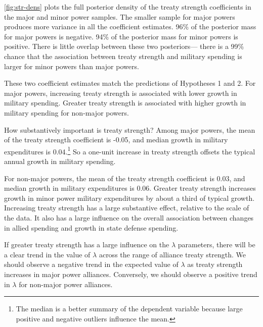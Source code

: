 \documentclass[12pt]{article}
\begin{document}
\autoref{fig:str-dens} plots the full posterior density of the treaty strength coefficients in the major and minor power samples. 
The smaller sample for major powers produces more variance in all the coefficient estimates. 
96\% of the posterior mass for major powers is negative. 
94\% of the posterior mass for minor powers is positive. 
There is little overlap between these two posteriors--- there is a 99\% chance that the association between treaty strength and military spending is larger for minor powers than major powers. 


These two coefficient estimates match the predictions of Hypotheses 1 and 2. 
For major powers, increasing treaty strength is associated with lower growth in military spending. 
Greater treaty strength is associated with higher growth in military spending for non-major powers.


How substantively important is treaty strength? 
Among major powers, the mean of the treaty strength coefficient is -0.05, and median growth in military expenditures is 0.04.\footnote{The median is a better summary of the dependent variable because large positive and negative outliers influence the mean.} 
So a one-unit increase in treaty strength offsets the typical annual growth in military spending. 


For non-major powers, the mean of the treaty strength coefficient is 0.03, and median growth in military expenditures is 0.06. 
Greater treaty strength increases growth in minor power military expenditures by about a third of typical growth. 
Increasing treaty strength has a large substantive effect, relative to the scale of the data. 
It also has a large influence on the overall association between changes in allied spending and growth in state defense spending. 


If greater treaty strength has a large influence on the $\lambda$ parameters, there will be a clear trend in the value of $\lambda$ across the range of alliance treaty strength.
We should observe a negative trend in the expected value of $\lambda$ as treaty strength increases in major power alliances. 
Conversely, we should observe a positive trend in $\lambda$ for non-major power alliances. 
\end{document}
